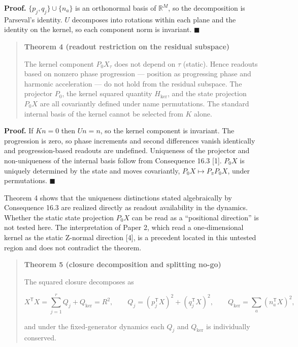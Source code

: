 \documentclass[
  a4paper,
]{article}
\begin{document}
\textbf{Proof.} \(\{p_j,q_j\}\cup\{n_a\}\) is an orthonormal basis of
\(\mathbb R^M\), so the decomposition is Parseval's identity. \(U\)
decomposes into rotations within each plane and the identity on the
kernel, so each component norm is invariant. \(\blacksquare\)

\begin{quote}
\textbf{Theorem 4 (readout restriction on the residual subspace)}

The kernel component \(P_0X_\tau\) does not depend on \(\tau\) (static).
Hence readouts based on nonzero phase progression --- position as
progressing phase and harmonic acceleration --- do not hold from the
residual subspace. The projector \(P_0\), the kernel squared quantity
\(H_{\ker}\), and the state projection \(P_0X\) are all covariantly
defined under name permutations. The standard internal basis of the
kernel cannot be selected from \(K\) alone.
\end{quote}

\textbf{Proof.} If \(Kn=0\) then \(Un=n\), so the kernel component is
invariant. The progression is zero, so phase increments and second
differences vanish identically and progression-based readouts are
undefined. Uniqueness of the projector and non-uniqueness of the
internal basis follow from Consequence 16.3 {[}1{]}. \(P_0X\) is
uniquely determined by the state and moves covariantly,
\(P_0X\mapsto P_\pi P_0X\), under permutations. \(\blacksquare\)

Theorem 4 shows that the uniqueness distinctions stated algebraically by
Consequence 16.3 are realized directly as readout availability in the
dynamics. Whether the static state projection \(P_0X\) can be read as a
``positional direction'' is not tested here. The interpretation of Paper
2, which read a one-dimensional kernel as the static Z-normal direction
{[}4{]}, is a precedent located in this untested region and does not
contradict the theorem.

\begin{quote}
\textbf{Theorem 5 (closure decomposition and splitting no-go)}

The squared closure decomposes as

\[
X^{\mathsf T}X
=\sum_{j=1}^{r}Q_j+Q_{\ker}
=R^2,
\qquad
Q_j=(p_j^{\mathsf T}X)^2+(q_j^{\mathsf T}X)^2,
\qquad
Q_{\ker}=\sum_a(n_a^{\mathsf T}X)^2,
\]

and under the fixed-generator dynamics each \(Q_j\) and \(Q_{\ker}\) is
individually conserved.
\end{quote}
\end{document}
